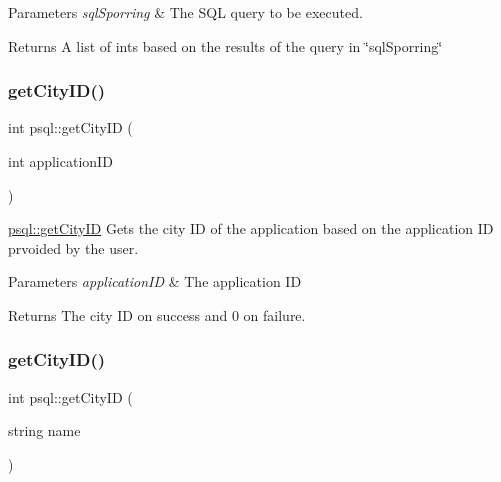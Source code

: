 \begin{DoxyParams}{Parameters}
{\em sql\+Sporring} & The S\+QL query to be executed. \\
\hline
\end{DoxyParams}
\begin{DoxyReturn}{Returns}
A list of ints based on the results of the query in \char`\"{}sql\+Sporring\char`\"{} 
\end{DoxyReturn}
\mbox{\label{classpsql_af3462a12dc106e0ca8df4fa8fcf28436}} 
\subsubsection{\texorpdfstring{get\+City\+I\+D()}{getCityID()}\hspace{0.1cm}{\footnotesize\ttfamily [1/2]}}
{\footnotesize\ttfamily int psql\+::get\+City\+ID (\begin{DoxyParamCaption}\item[{int}]{application\+ID }\end{DoxyParamCaption})}



\mbox{\hyperlink{classpsql_af3462a12dc106e0ca8df4fa8fcf28436}{psql\+::get\+City\+ID}} Gets the city ID of the application based on the application ID prvoided by the user. 


\begin{DoxyParams}{Parameters}
{\em application\+ID} & The application ID \\
\hline
\end{DoxyParams}
\begin{DoxyReturn}{Returns}
The city ID on success and 0 on failure. 
\end{DoxyReturn}
\mbox{\label{classpsql_a0c33b3f48064ba75abaa4b0b58eb1ccd}} 
\subsubsection{\texorpdfstring{get\+City\+I\+D()}{getCityID()}\hspace{0.1cm}{\footnotesize\ttfamily [2/2]}}
{\footnotesize\ttfamily int psql\+::get\+City\+ID (\begin{DoxyParamCaption}\item[{string}]{name }\end{DoxyParamCaption})}



